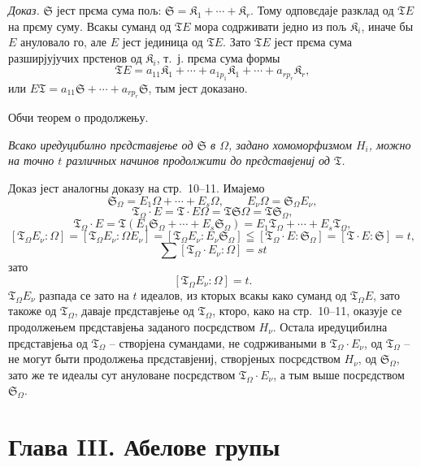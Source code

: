 \documentclass[11pt]{article}
\begin{document}
\emph{Доказ.} \(\mathfrak S\) јест прєма сума пољ: \(\mathfrak S=\mathfrak K_1+\cdots+\mathfrak K_r\). Тому одповєдаје разклад од \(\mathfrak T E\) на прєму суму. Всакы суманд од \(\mathfrak T E\) мора содрживати једно из пољ \(\mathfrak K_i\), иначе бы \(E\) ануловало го, але \(E\) јест јединица од \(\mathfrak T E\). Зато \(\mathfrak T E\) јест прєма сума разширјујучих прстенов од \(\mathfrak K_i\), т.~ј. прєма сума формы
\[
\mathfrak T E=a_{11}\mathfrak K_1+\cdots+a_{1p_1}\mathfrak K_1+\cdots+a_{rp_r}\mathfrak K_r,
\]
или \(E\mathfrak T=a_{11}\mathfrak S+\cdots+a_{rp_r}\mathfrak S\), тым јест доказано.

\begin{center}
Обчи теорем о продолжењу.
\end{center}

\emph{Всако иредуцибилно прєдставјење од \(\mathfrak S\) в \(\Omega\), задано хомоморфизмом \(H_i\), можно на точно \(t\) различных начинов продолжити до прєдставјениј од \(\mathfrak T\).}

Доказ јест аналогны доказу на стр.~10--11. Имајемо
\[
\mathfrak S_\Omega=E_1\Omega+\cdots+E_s\Omega,\qquad
E_\nu\Omega=\mathfrak S_\Omega E_\nu,
\]
\[
\mathfrak T_\Omega\cdot E=\mathfrak T\cdot E\Omega
=\mathfrak T\mathfrak S\Omega=\mathfrak T\mathfrak S_\Omega,
\]
\[
\mathfrak T_\Omega\cdot E
=\mathfrak T(E_1\mathfrak S_\Omega+\cdots+E_s\mathfrak S_\Omega)
=E_1\mathfrak T_\Omega+\cdots+E_s\mathfrak T_\Omega,
\]
\[
[\mathfrak T_\Omega E_\nu:\Omega]
=[\mathfrak T_\Omega E_\nu:\Omega E_\nu]
=[\mathfrak T_\Omega E_\nu:E_\nu\mathfrak S_\Omega]
\leqq[\mathfrak T_\Omega\cdot E:\mathfrak S_\Omega]
=[\mathfrak T\cdot E:\mathfrak S]=t,
\]
\[
\sum[\mathfrak T_\Omega\cdot E_\nu:\Omega]=st
\]
зато
\[
[\mathfrak T_\Omega E_\nu:\Omega]=t.
\]
\(\mathfrak T_\Omega E_\nu\) разпада се зато на \(t\) идеалов, из кторых всакы како суманд од \(\mathfrak T_\Omega E\), зато такоже од \(\mathfrak T_\Omega\), даваје прєдставјење од \(\mathfrak T_\Omega\), кторо, како на стр.~10--11, оказује се продолжењем прєдставјења заданого посрєдством \(H_\nu\). Остала иредуцибилна прєдставјења од \(\mathfrak T_\Omega\) -- створјена сумандами, не содрживаными в \(\mathfrak T_\Omega\cdot E_\nu\), од \(\mathfrak T_\Omega\) -- не могут быти продолжења прєдставјениј, створјеных посрєдством \(H_\nu\), од \(\mathfrak S_\Omega\), зато же те идеалы сут ануловане посрєдством \(\mathfrak T_\Omega\cdot E_\nu\), а тым выше посрєдством \(\mathfrak S_\Omega\).

\section*{Глава III. Абелове групы}\label{kapitel-iii.-abelsche-gruppen}
\end{document}
